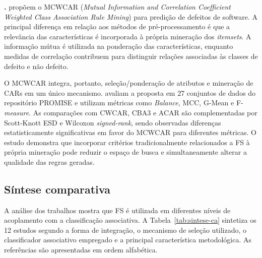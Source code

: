\medskip

\noindent\textbf{.}
 propõem o MCWCAR (\textit{Mutual Information and
Correlation Coefficient Weighted Class Association Rule Mining}) para predição
de defeitos de software. A principal diferença em relação aos métodos de
pré-processamento é que a relevância das características é incorporada à própria
mineração dos \textit{itemsets}. A informação mútua é utilizada na ponderação
das características, enquanto medidas de correlação contribuem para distinguir
relações associadas às classes de defeito e não defeito.

O MCWCAR integra, portanto, seleção/ponderação de atributos e mineração de CARs
em um único mecanismo.  avaliam a proposta em 27
conjuntos de dados do repositório PROMISE e utilizam métricas como
\textit{Balance}, MCC, G-Mean e F-\textit{measure}. As comparações com CWCAR,
CBA3 e ACAR são complementadas por Scott-Knott ESD e Wilcoxon
\textit{signed-rank}, sendo observadas diferenças estatisticamente
significativas em favor do MCWCAR para diferentes métricas. O estudo demonstra
que incorporar critérios tradicionalmente relacionados a FS à própria mineração
pode reduzir o espaço de busca e simultaneamente alterar a qualidade das regras
geradas.

\subsection{Síntese comparativa}
\label{subsec:sintese-ca}

A análise dos trabalhos mostra que FS é utilizada em diferentes níveis de
acoplamento com a classificação associativa. A Tabela~\ref{tab:sintese-ca}
sintetiza os 12 estudos segundo a forma de integração, o mecanismo de seleção
utilizado, o classificador associativo empregado e a principal característica
metodológica. As referências são apresentadas em ordem alfabética.

\begingroup
\scriptsize
\setlength{\tabcolsep}{3pt}
\renewcommand{\arraystretch}{1.15}


